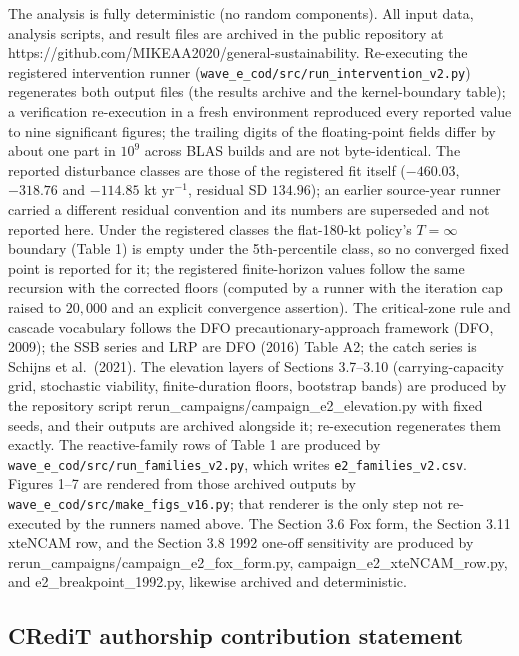 \documentclass[11pt]{article}
\begin{document}
The analysis is fully deterministic (no random components). All input
data, analysis scripts, and result files are archived in the public
repository at https://github.com/MIKEAA2020/general-sustainability.
Re-executing the registered intervention runner
(\texttt{wave\_e\_cod/src/run\_intervention\_v2.py}) regenerates both
output files (the results archive and the kernel-boundary table); a
verification re-execution in a fresh environment reproduced every
reported value to nine significant figures; the trailing digits of the
floating-point fields differ by about one part in \(10^{9}\) across BLAS
builds and are not byte-identical. The reported disturbance classes are
those of the registered fit itself (\(-460.03\), \(-318.76\) and
\(-114.85\) kt yr\(^{-1}\), residual SD \(134.96\)); an earlier
source-year runner carried a different residual convention and its
numbers are superseded and not reported here. Under the registered
classes the flat-180-kt policy's
\(T=\infty\) boundary (Table 1) is empty under the 5th-percentile class,
so no converged fixed point is reported for it; the registered
finite-horizon values follow the same recursion with the corrected
floors (computed by a runner with the iteration cap raised to
\(20{,}000\) and an explicit convergence assertion). The critical-zone
rule and cascade vocabulary follows the DFO precautionary-approach
framework (DFO, 2009); the SSB series and LRP are DFO (2016) Table A2;
the catch series is Schijns et al.~(2021). The elevation layers of
Sections 3.7--3.10 (carrying-capacity grid, stochastic viability,
finite-duration floors, bootstrap bands) are produced by the repository
script rerun\_campaigns/campaign\_e2\_elevation.py with fixed seeds, and
their outputs are archived alongside it; re-execution regenerates them
exactly. The reactive-family rows of Table 1 are produced by
\texttt{wave\_e\_cod/src/run\_families\_v2.py}, which writes
\texttt{e2\_families\_v2.csv}. Figures 1--7 are rendered from those
archived outputs by \texttt{wave\_e\_cod/src/make\_figs\_v16.py}; that
renderer is the only step not re-executed by the runners named above. The Section 3.6 Fox form, the
Section 3.11 xteNCAM row, and the Section 3.8 1992 one-off sensitivity
are produced by rerun\_campaigns/campaign\_e2\_fox\_form.py,
campaign\_e2\_xteNCAM\_row.py, and e2\_breakpoint\_1992.py, likewise
archived and deterministic.

\subsection*{CRediT authorship contribution statement}
\end{document}
